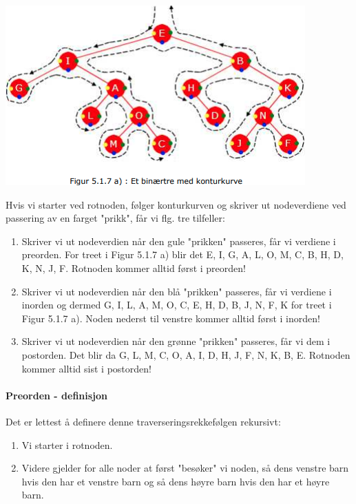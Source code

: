 \documentclass[11pt]{article}
\begin{document}
    \begin{multicols}{2}
        \includegraphics[scale=0.8]{figur.5.1.7a.png}

        \columnbreak

        Hvis vi starter ved rotnoden, følger konturkurven og skriver ut nodeverdiene ved passering av
        en farget "prikk", får vi flg. tre tilfeller: \\

        \begin{enumerate}
            \item Skriver vi ut nodeverdien når den gule "prikken" passeres, får vi verdiene i preorden.
                For treet i Figur 5.1.7 a) blir det E, I, G, A, L, O, M, C, B, H, D, K, N, J, F. Rotnoden
                kommer alltid først i preorden!
            \item  Skriver vi ut nodeverdien når den blå "prikken" passeres, får vi verdiene i inorden og
                dermed G, I, L, A, M, O, C, E, H, D, B, J, N, F, K for treet i Figur 5.1.7 a). Noden
                nederst til venstre kommer alltid først i inorden!
            \item  Skriver vi ut nodeverdien når den grønne "prikken" passeres, får vi dem i postorden.
                Det blir da G, L, M, C, O, A, I, D, H, J, F, N, K, B, E. Rotnoden kommer alltid sist i
                postorden!
        \end{enumerate}
        
    \end{multicols}




        \paragraph{Preorden - definisjon}
        Det er lettest å definere denne traverseringsrekkefølgen rekursivt: \\
        \begin{enumerate}
            \item Vi starter i rotnoden.
            \item Videre gjelder for alle noder at først "besøker" vi noden, så dens venstre barn hvis den
                har et venstre barn og så dens høyre barn hvis den har et høyre barn.
        \end{enumerate}
\end{document}
